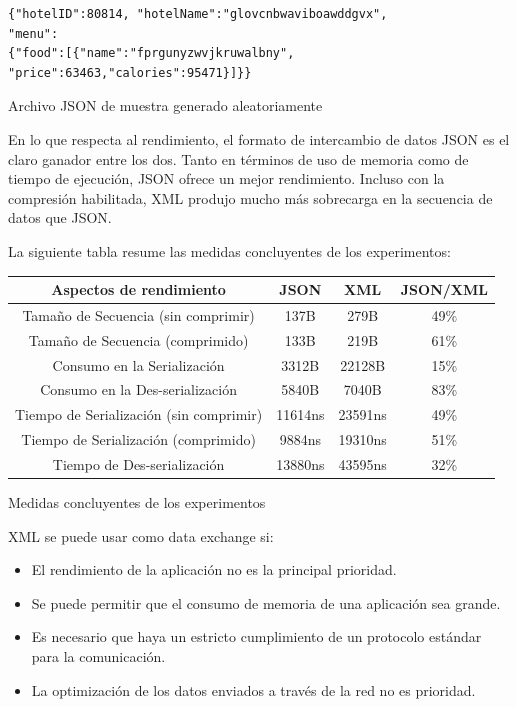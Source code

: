 \begin{verbatim}
{"hotelID":80814, "hotelName":"glovcnbwaviboawddgvx", 
"menu":
{"food":[{"name":"fprgunyzwvjkruwalbny",
"price":63463,"calories":95471}]}}
\end{verbatim}
\begin{center}
\caption{Archivo JSON de muestra generado aleatoriamente}
\end{center}



En lo que respecta al rendimiento, el formato de intercambio de datos JSON es el claro ganador entre los dos. Tanto en términos de uso de memoria como de tiempo de ejecución, JSON ofrece un mejor rendimiento. Incluso con la compresión habilitada, XML produjo mucho más sobrecarga en la secuencia de datos que JSON.

La siguiente tabla resume las medidas concluyentes de los experimentos:

\begin{center}
 \begin{tabular}{ | c | c | c | c |} 
   \hline
   Aspectos de rendimiento & JSON & XML & JSON/XML  \\ 
   \hline
   Tamaño de Secuencia (sin comprimir) & 137B & 279B & 49\% \\
   \hline
   Tamaño de Secuencia (comprimido) & 133B & 219B & 61\% \\
   \hline
   Consumo en la Serialización & 3312B & 22128B & 15\% \\
   \hline
   Consumo en la Des-serialización & 5840B & 7040B & 83\% \\
   \hline
   Tiempo de Serialización (sin comprimir) & 11614ns & 23591ns & 49\% \\
   \hline
   Tiempo de Serialización (comprimido) & 9884ns & 19310ns & 51\% \\
   \hline
   Tiempo de Des-serialización & 13880ns & 43595ns & 32\% \\
   \hline
 
\end{tabular}
\end{center}
\begin{center}
\caption{Medidas concluyentes de los experimentos}
\end{center}

XML se puede usar como data exchange si:
\begin{itemize}
    \item El rendimiento de la aplicación no es la principal prioridad.
    \item Se puede permitir que el consumo de memoria de una aplicación sea grande.
    \item Es necesario que haya un estricto cumplimiento de un protocolo estándar para la comunicación.
    \item La optimización de los datos enviados a través de la red no es prioridad.
\end{itemize}

